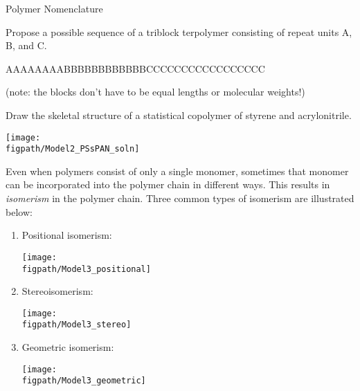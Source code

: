 \begin{activity}{Polymer Nomenclature}
\begin{ctqs}
\begin{enumerate}
		\end{enumerate}
		
	\question Propose a possible sequence of a triblock terpolymer consisting of repeat units A, B, and C.
	
		\begin{solution}[0.25in]{}
		
			AAAAAAAABBBBBBBBBBBBCCCCCCCCCCCCCCCCC
			
			(note: the blocks don't have to be equal lengths or molecular weights!)
	
		\end{solution}
	
	\question Draw the skeletal structure of a statistical copolymer of styrene and acrylonitrile.
	
		\begin{solution}[0.75in]{}
			\centerline{\texttt{[image: \\figpath/Model2\_PSsPAN\_soln]}}
		\end{solution}
	
\end{ctqs}


\begin{model}[Isomerism]

	Even when polymers consist of only a single monomer, sometimes that monomer can be incorporated into the polymer chain in different ways.  This results in \textit{isomerism} in the polymer chain.  Three common types of isomerism are illustrated below:
	
	\begin{enumerate}
		\item Positional isomerism:
		
			\centerline{\texttt{[image: \\figpath/Model3\_positional]}}
		
		\item Stereoisomerism:
		
			\centerline{\texttt{[image: \\figpath/Model3\_stereo]}}
		
		\item Geometric isomerism:
		
		\vspace{4pt}	\centerline{\texttt{[image: \\figpath/Model3\_geometric]}}
		
	\end{enumerate}

\end{model}

\begin{ctqs}


\end{ctqs}
\end{activity}
